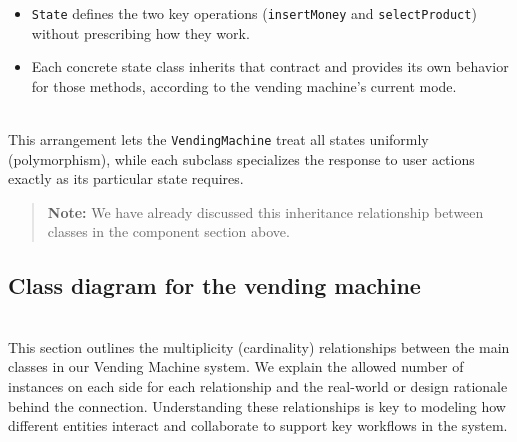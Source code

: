 \begin{itemize}
\item
\protect{}\label{KokdFMtoh-ezkdCtdjCVo}
\texttt{State} defines the two key operations (\texttt{insertMoney} and \texttt{selectProduct}) without prescribing how they work.
\item
\protect{}\label{6UUl_uxNo187ugcC3yy7e}
Each concrete state class inherits that contract and provides its own behavior for those methods, according to the vending machine's current mode.
\end{itemize}
\\
This arrangement lets the \texttt{VendingMachine} treat all states uniformly (polymorphism), while each subclass specializes the response to user actions exactly as its particular state requires.
\begin{quote}
\textbf{Note:} We have already discussed this inheritance relationship between classes in the component section above.
\end{quote}
\subsection{Class diagram for the vending machine}\label{6_5PQWr0sSZK4UjCVH12v}
\\
This section outlines the multiplicity (cardinality) relationships between the main classes in our Vending Machine system. We explain the allowed number of instances on each side for each relationship and the real-world or design rationale behind the connection. Understanding these relationships is key to modeling how different entities interact and collaborate to support key workflows in the system.

